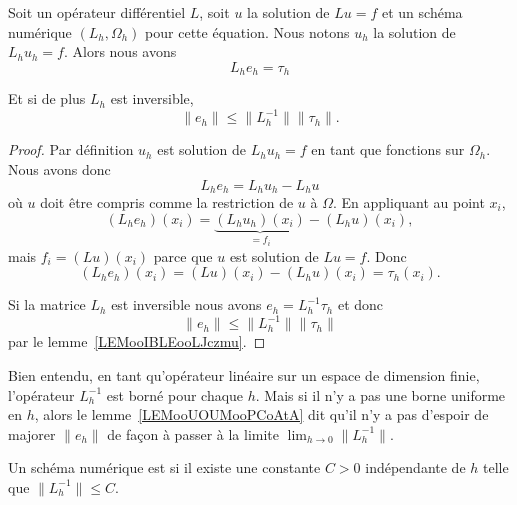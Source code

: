 \begin{lemma}       \label{LEMooUOUMooPCoAtA}
	Soit un opérateur différentiel \( L\), soit \( u\) la solution de \( Lu=f\) et un schéma numérique \( (L_h,\Omega_h)\) pour cette équation. Nous notons \( u_h\) la solution de \( L_hu_h=f\). Alors nous avons
	\begin{equation}
		L_he_h=\tau_h
	\end{equation}

	Et si de plus \( L_h\) est inversible,
	\begin{equation}
		\| e_h \|\leq \| L_h^{-1} \|\| \tau_h \|.
	\end{equation}
\end{lemma}

\begin{proof}
	Par définition \( u_h\) est solution de \( L_hu_h=f\) en tant que fonctions sur \( \Omega_h\). Nous avons donc
	\begin{equation}
		L_he_h=L_hu_h-L_hu
	\end{equation}
	où \( u\) doit être compris comme la restriction de \( u\) à \( \Omega\). En appliquant au point \( x_i\),
	\begin{equation}
		(L_he_h)(x_i)=\underbrace{(L_hu_h)(x_i)}_{=f_i}-(L_hu)(x_i),
	\end{equation}
	mais \( f_i=(Lu)(x_i)\) parce que \( u\) est solution de \( Lu=f\). Donc
	\begin{equation}
		(L_he_h)(x_i)=(Lu)(x_i)-(L_hu)(x_i)=\tau_h(x_i).
	\end{equation}

	Si la matrice \( L_h\) est inversible nous avons \( e_h=L_h^{-1}\tau_h\) et donc
	\begin{equation}
		\| e_h \|\leq \| L_h^{-1} \|\| \tau_h \|
	\end{equation}
	par le lemme~\ref{LEMooIBLEooLJczmu}.
\end{proof}

Bien entendu, en tant qu'opérateur linéaire sur un espace de dimension finie, l'opérateur \( L_h^{-1}\) est borné pour chaque \( h\). Mais si il n'y a pas une borne uniforme en \( h\), alors le lemme~\ref{LEMooUOUMooPCoAtA} dit qu'il n'y a pas d'espoir de majorer \( \| e_h \|\) de façon à passer à la limite \( \lim_{h\to 0} \| L_h^{-1} \|\).

\begin{definition}
	Un schéma numérique est  si il existe une constante \( C>0\) indépendante de \( h\) telle que \( \| L_h^{-1} \|\leq C\).
\end{definition}


